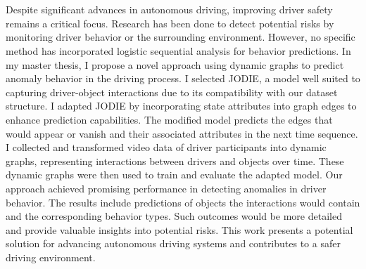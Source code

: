 \chapter{\abstractname}

Despite significant advances in autonomous driving, improving driver safety remains a critical focus. Research has been done to detect potential risks by monitoring driver behavior or the surrounding environment. However, no specific method has incorporated logistic sequential analysis for behavior predictions. In my master thesis, I propose a novel approach using dynamic graphs to predict anomaly behavior in the driving process. I selected JODIE, a model well suited to capturing driver-object interactions due to its compatibility with our dataset structure. I adapted JODIE by incorporating state attributes into graph edges to enhance prediction capabilities. The modified model predicts the edges that would appear or vanish and their associated attributes in the next time sequence. I collected and transformed video data of driver participants into dynamic graphs, representing interactions between drivers and objects over time. These dynamic graphs were then used to train and evaluate the adapted model. Our approach achieved promising performance in detecting anomalies in driver behavior. The results include predictions of objects the interactions would contain and the corresponding behavior types. Such outcomes would be more detailed and provide valuable insights into potential risks. This work presents a potential solution for advancing autonomous driving systems and contributes to a safer driving environment.



\makeatletter
{}
{\renewcommand{\abstractname}{Kurzfassung}}
{\renewcommand{\abstractname}{Abstract}}
\makeatother

\chapter{\abstractname}


